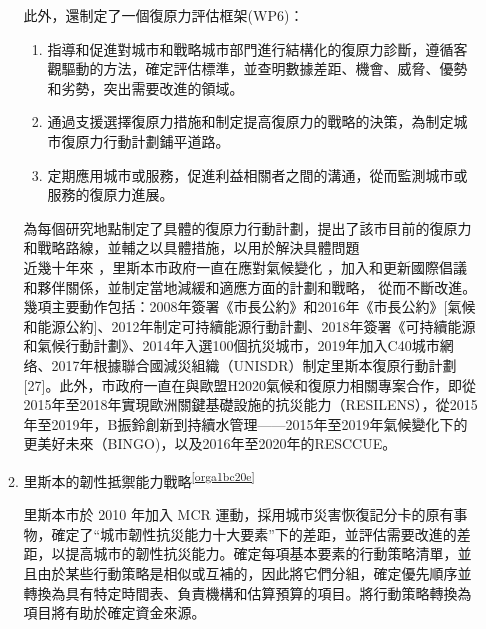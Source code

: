 \documentclass[a4paper,12pt]{article}
\begin{document}
\begin{enumerate}
\begin{enumerate}
此外，還制定了一個復原力評估框架(WP6)：\\
\begin{enumerate}
\item 指導和促進對城市和戰略城市部門進行結構化的復原力診斷，遵循客觀驅動的方法，確定評估標準，並查明數據差距、機會、威脅、優勢和劣勢，突出需要改進的領域。\\
\item 通過支援選擇復原力措施和制定提高復原力的戰略的決策，為制定城市復原力行動計劃鋪平道路。\\
\item 定期應用城市或服務，促進利益相關者之間的溝通，從而監測城市或服務的復原力進展。\\
\end{enumerate}

為每個研究地點制定了具體的復原力行動計劃，提出了該市目前的復原力和戰略路線，並輔之以具體措施，以用於解決具體問題\\

近幾十年來 ，里斯本市政府一直在應對氣候變化 ，加入和更新國際倡議 和夥伴關係，並制定當地減緩和適應方面的計劃和戰略， 從而不斷改進。幾項主要動作包括：2008年簽署《市長公約》和2016年《市長公約》[氣候和能源公約]、2012年制定可持續能源行動計劃、2018年簽署《可持續能源和氣候行動計劃》、2014年入選100個抗災城市，2019年加入C40城市網络、2017年根據聯合國減災組織（UNISDR）制定里斯本復原行動計劃[27]。此外，市政府一直在與歐盟H2020氣候和復原力相關專案合作，即從2015年至2018年實現歐洲關鍵基礎設施的抗災能力（RESILENS），從2015年至2019年，B振鈴創新到持續水管理——2015年至2019年氣候變化下的更美好未來（BINGO)，以及2016年至2020年的RESCCUE。\\
\item 里斯本的韌性抵禦能力戰略\textsuperscript{\ref{orga1bc20e}}
\label{sec:orgc0d342a}

里斯本市於 2010 年加入 MCR 運動，採用城市災害恢復記分卡的原有事物，確定了“城市韌性抗災能力十大要素”下的差距，並評估需要改進的差距，以提高城市的韌性抗災能力。確定每項基本要素的行動策略清單，並且由於某些行動策略是相似或互補的，因此將它們分組，確定優先順序並轉換為具有特定時間表、負責機構和估算預算的項目。將行動策略轉換為項目將有助於確定資金來源。\\


\end{enumerate}
\end{enumerate}
\end{document}
